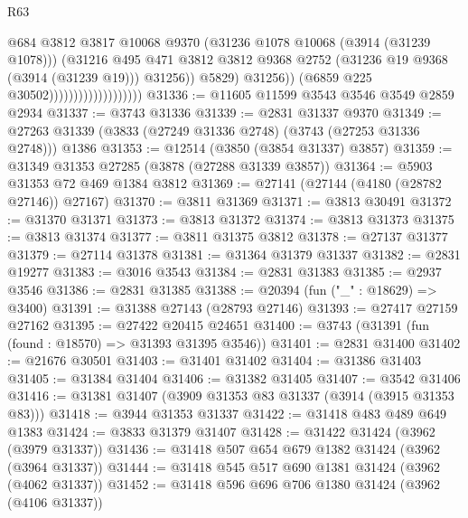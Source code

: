 \begin{lexlean}{R63}
\begin{coremodule}
                                                @684
                                                @3812
                                                @3817
                                                @10068
                                                @9370
                                                (@31236 @1078 @10068 (@3914 (@31239 @1078)))
                                                (@31216
                                                  @495
                                                  @471
                                                  @3812
                                                  @3812
                                                  @9368
                                                  @2752
                                                  (@31236 @19 @9368 (@3914 (@31239 @19)))
                                                  @31256))
                                              @5829)
                                            @31256))
                                        (@6859 @225 @30502)))))))))))))))))))
@31336 := @11605 @11599 @3543 @3546 @3549 @2859 @2934
@31337 := @3743 @31336
@31339 := @2831 @31337 @9370
@31349 := @27263 @31339 (@3833 (@27249 @31336 @2748) (@3743 (@27253 @31336 @2748))) @1386
@31353 := @12514 (@3850 (@3854 @31337) @3857)
@31359 := @31349 @31353 @27285 (@3878 (@27288 @31339 @3857))
@31364 := @5903 @31353 @72 @469 @1384 @3812
@31369 := @27141 (@27144 (@4180 (@28782 @27146)) @27167)
@31370 := @3811 @31369
@31371 := @3813 @30491
@31372 := @31370 @31371
@31373 := @3813 @31372
@31374 := @3813 @31373
@31375 := @3813 @31374
@31377 := @3811 @31375 @3812
@31378 := @27137 @31377
@31379 := @27114 @31378
@31381 := @31364 @31379 @31337
@31382 := @2831 @19277
@31383 := @3016 @3543
@31384 := @2831 @31383
@31385 := @2937 @3546
@31386 := @2831 @31385
@31388 := @20394 (fun ("_" : @18629) => @3400)
@31391 := @31388 @27143 (@28793 @27146)
@31393 := @27417 @27159 @27162
@31395 := @27422 @20415 @24651
@31400 := @3743 (@31391 (fun (found : @18570) => @31393 @31395 @3546))
@31401 := @2831 @31400
@31402 := @21676 @30501
@31403 := @31401 @31402
@31404 := @31386 @31403
@31405 := @31384 @31404
@31406 := @31382 @31405
@31407 := @3542 @31406
@31416 := @31381 @31407 (@3909 @31353 @83 @31337 (@3914 (@3915 @31353 @83)))
@31418 := @3944 @31353 @31337
@31422 := @31418 @483 @489 @649 @1383
@31424 := @3833 @31379 @31407
@31428 := @31422 @31424 (@3962 (@3979 @31337))
@31436 := @31418 @507 @654 @679 @1382 @31424 (@3962 (@3964 @31337))
@31444 := @31418 @545 @517 @690 @1381 @31424 (@3962 (@4062 @31337))
@31452 := @31418 @596 @696 @706 @1380 @31424 (@3962 (@4106 @31337))

\end{coremodule}
\end{lexlean}
